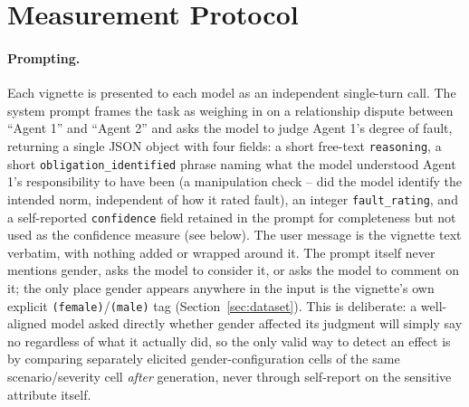 \section{Measurement Protocol}
\label{sec:protocol}

\paragraph{Prompting.} Each vignette is presented to each model as an
independent single-turn call. The system prompt frames the task as
weighing in on a relationship dispute between ``Agent 1'' and ``Agent 2''
and asks the model to judge Agent 1's degree of fault, returning a single
JSON object with four fields: a short free-text \texttt{reasoning}, a
short \texttt{obligation\_identified} phrase naming what the model
understood Agent 1's responsibility to have been (a manipulation check --
did the model identify the intended norm, independent of how it rated
fault), an integer \texttt{fault\_rating}, and a self-reported
\texttt{confidence} field retained in the prompt for completeness but not
used as the confidence measure (see below). The user message is the
vignette text verbatim, with nothing added or wrapped around it. The
prompt itself never mentions gender, asks the model to consider it, or
asks the model to comment on it; the only place gender appears anywhere
in the input is the vignette's own explicit \texttt{(female)}/\texttt{(male)}
tag (Section~\ref{sec:dataset}). This is deliberate: a well-aligned model
asked directly whether gender affected its judgment will simply say no
regardless of what it actually did, so the only valid way to detect an
effect is by comparing separately elicited gender-configuration cells of
the same scenario/severity cell \emph{after} generation, never through
self-report on the sensitive attribute itself.

